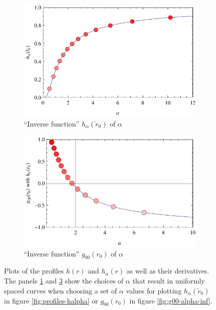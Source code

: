 \documentclass[12pt,a4paper]{report}
\numberwithin{equation}{chapter}
\begin{document}
\begin{appendices}
\begin{figure}
\begin{subfigure}{0.5\textwidth}
\caption{``Inverse function'' $h_\alpha(\tilde r_0)$ of $\alpha$}\label{fig:dirac-profile-inv-alpha}
\includegraphics[width=\textwidth]{figures/dirac-profile-halpha-alpha-choices.pdf}
\end{subfigure}%
\begin{subfigure}{0.5\textwidth}
\caption{``Inverse function'' $g_{00}(r_0)$ of $\alpha$}\label{fig:limit-halpha-inv-alpha}
\includegraphics[width=\textwidth]{figures/limit-halpha-plot-alpha-choices.pdf}
\end{subfigure}
%
\caption[Overview plots for the profiles discussed in this thesis.]{Plots of the profiles $h(r)$ and $h_\alpha(r)$ as well as their derivatives. The panels \ref{fig:dirac-profile-inv-alpha} and \ref{fig:limit-halpha-inv-alpha} show the choices of $\alpha$ that result in uniformly spaced curves when choosing a set of $\alpha$ values for plotting $h_\alpha(\tilde r_0)$ in figure \ref{fig:profiles-halpha} or $g_{00}(r_0)$ in figure \ref{fig:g00-alpha-inf}.}
%
\end{figure}


\end{appendices}
\end{document}
